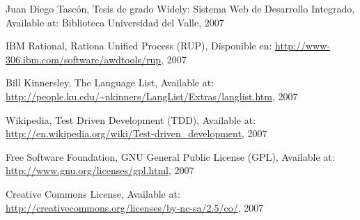 \begin{thebibliography}{99}

 Juan Diego Tascón, Tesis de grado Widely: Sistema Web de Desarrollo Integrado, Available at:
	Biblioteca Universidad del Valle, 2007

 IBM Rational, Rationa Unified Process (RUP), Disponible en:
	\url{http://www-306.ibm.com/software/awdtools/rup}, 2007

 Bill Kinnersley, The Language List, Available at:
	\url{http://people.ku.edu/~nkinners/LangList/Extras/langlist.htm}, 2007

 Wikipedia, Test Driven Development (TDD), Available at:
	\url{http://en.wikipedia.org/wiki/Test-driven_development}, 2007

 Free Software Foundation, GNU General Public License (GPL), Available at:
	\url{http://www.gnu.org/licenses/gpl.html}, 2007

 Creative Commons License, Available at:
	\url{http://creativecommons.org/licenses/by-nc-sa/2.5/co/}, 2007

\end{thebibliography}
